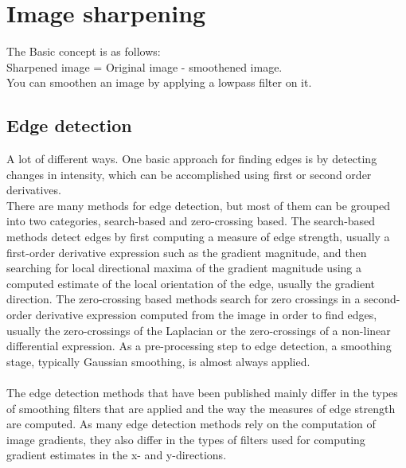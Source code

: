 \documentclass[12pt]{article}
\begin{document}
\section{Image sharpening}
	The Basic concept is as follows:\\
	Sharpened image = Original image - smoothened image.\\
	You can smoothen an image by applying a lowpass filter on it.
	
	\subsection{Edge detection}
	A lot of different ways. One basic approach for finding edges is by detecting changes in intensity, 
	which can be accomplished using first or second order derivatives. \\
	
	\noindent [W]	There are many methods for edge detection, but most of them can be grouped into two categories, 
	search-based and zero-crossing based. The search-based methods detect edges by first computing a measure 
	of edge strength, usually a first-order derivative expression such as the gradient magnitude, and then 
	searching for local directional maxima of the gradient magnitude using a computed estimate of the local 
	orientation of the edge, usually the gradient direction. The zero-crossing based methods search for zero
	crossings in a second-order derivative expression computed from the image in order to find edges, usually 
	the zero-crossings of the Laplacian or the zero-crossings of a non-linear differential expression. As a
	pre-processing step to edge detection, a smoothing stage, typically Gaussian smoothing, is almost always applied.\\
	\\
    The edge detection methods that have been published mainly differ in the types of smoothing filters that are applied and the way the measures of edge        strength are computed. As many edge detection methods rely on the computation of image gradients, they also differ in the types of filters used for          computing gradient estimates in the x- and y-directions.
	
\end{document}
